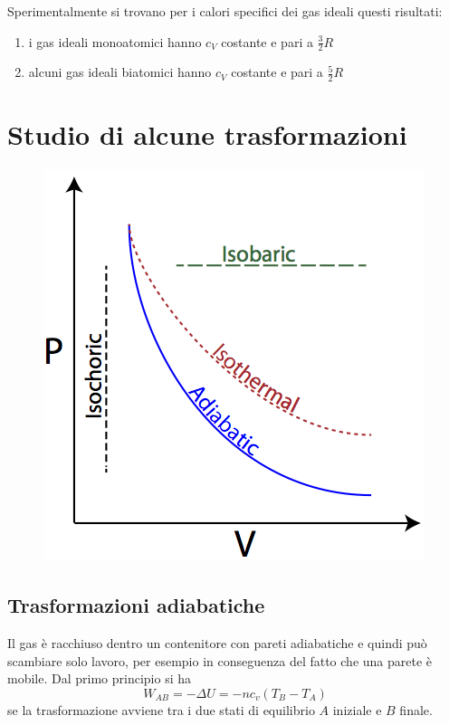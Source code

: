 \documentclass[class=book, crop=false, oneside, 12pt]{standalone}
\begin{document}
Sperimentalmente si trovano per i calori specifici dei gas ideali questi risultati:
\begin{enumerate}
    \item i gas ideali monoatomici hanno \(c_V\) costante e pari a \(\frac{3}{2} R\)
    \item alcuni gas ideali biatomici hanno \(c_V\) costante e pari a \(\frac{5}{2} R\)
\end{enumerate}

\section{Studio di alcune trasformazioni}

\begin{figure}[h]
    \includegraphics[scale=0.4]{PV_diagram.png}
    \centering
    \caption{}
\end{figure}

\subsection{Trasformazioni adiabatiche}

Il gas è racchiuso dentro un contenitore con pareti adiabatiche e quindi può scambiare solo lavoro, per esempio in conseguenza del fatto che una parete è mobile. 
Dal primo principio si ha
\begin{equation*}
    W_{AB} = - \Delta U = - n c_v (T_B -T_A)
\end{equation*}
se la trasformazione avviene tra i due stati di equilibrio \(A\) iniziale e \(B\) finale. 
\end{document}
